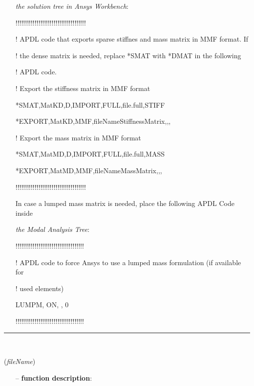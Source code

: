 \begin{itemize}[leftmargin=1.4cm]
\begin{itemize}[leftmargin=1.4cm]
\begin{itemize}[leftmargin=0.5cm]
\begin{itemize}[leftmargin=1.4cm]
\begin{itemize}[leftmargin=1.4cm]
\begin{itemize}[leftmargin=0.5cm]
\begin{itemize}[leftmargin=0.7cm]
\begin{itemize}[leftmargin=1.2cm]
\item[]{\it the solution tree in Ansys Workbench}:
\item[]!!!!!!!!!!!!!!!!!!!!!!!!!!!!!!!!!!!!!
\item[]! APDL code that exports sparse stiffnes and mass matrix in MMF format. If
\item[]! the dense matrix is needed, replace *SMAT with *DMAT in the following
\item[]! APDL code.
\item[]! Export the stiffness matrix in MMF format
\item[]*SMAT,MatKD,D,IMPORT,FULL,file.full,STIFF
\item[]*EXPORT,MatKD,MMF,fileNameStiffnessMatrix,,,
\item[]! Export the mass matrix in MMF format
\item[]*SMAT,MatMD,D,IMPORT,FULL,file.full,MASS
\item[]*EXPORT,MatMD,MMF,fileNameMassMatrix,,,
\item[]!!!!!!!!!!!!!!!!!!!!!!!!!!!!!!!!!!!!!
\item[]In case a lumped mass matrix is needed, place the following APDL Code inside
\item[]{\it the Modal Analysis Tree}:
\item[]!!!!!!!!!!!!!!!!!!!!!!!!!!!!!!!!!!!!
\item[]! APDL code to force Ansys to use a lumped mass formulation (if available for
\item[]! used elements)
\item[]LUMPM, ON, , 0
\item[]!!!!!!!!!!!!!!!!!!!!!!!!!!!!!!!!!!!!
\end{itemize}
\vspace{12pt}\end{itemize}
%
\noindent\rule{8cm}{0.75pt}\vspace{1pt} \\ 
\begin{flushleft}
\label{sec:FEM:ReadMatrixDOFmappingVectorFromAnsysTxt}
({\it fileName})
\end{flushleft}
\setlength{\itemindent}{0.7cm}
\begin{itemize}[leftmargin=0.7cm]
\item[--]{\bf function description}: \vspace{-6pt}
\begin{itemize}[leftmargin=1.2cm]

\end{itemize}
\end{itemize}
\end{itemize}
\end{itemize}
\end{itemize}
\end{itemize}
\end{itemize}
\end{itemize}
